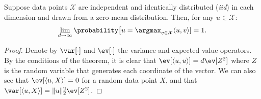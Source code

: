 \begin{theorem}
    \label{theorem:flavors:coincidence}
    Suppose data points $\mathcal{X}$ are independent and identically distributed (\emph{iid}) in each dimension
    and drawn from a zero-mean distribution. Then, for any $u \in \mathcal{X}$:
    \begin{equation*}
        \lim_{d \rightarrow \infty} \probability\big[ u = \argmax_{v \in \mathcal{X}}  \langle u, v \rangle ] = 1.
    \end{equation*}
\end{theorem}
\begin{proof}
    Denote by $\var[\cdot]$ and $\ev[\cdot]$ the variance and expected value operators.
    By the conditions of the theorem, it is clear that $\ev[\langle u, u \rangle] = d \ev[Z^2]$ where
    $Z$ is the random variable that generates each coordinate of the vector. We can also see that
    $\ev[\langle u, X \rangle] = 0$ for a random data point $X$, and that
    $\var[\langle u, X \rangle] = \lVert u \rVert_2^2 \ev[Z^2]$.


\end{proof}
